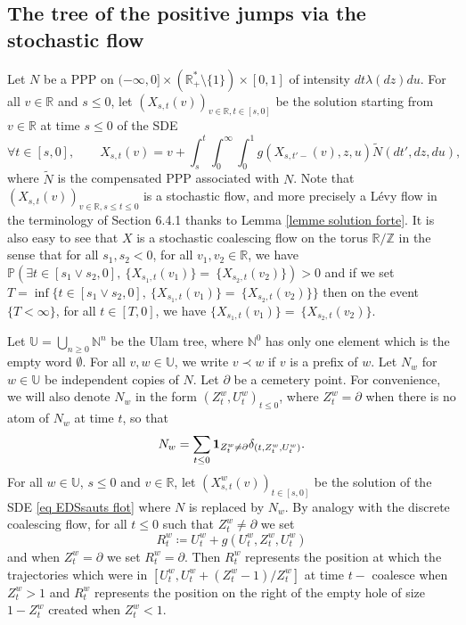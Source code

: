 \documentclass[11pt]{article}
\numberwithin{equation}{section}
\def \R{\mathbb {R}}
\def \N{\mathbb{N}}
\def \Z{\mathbb{Z}}
\def \U{\mathbb{U}}
\def\P{\mathbb{P}}
\begin{document}
\subsection{The tree of the positive jumps via the stochastic flow}\label{sous-section definition de la limite}
Let $N$ be a PPP on $(-\infty,0]\times (\R^*_+\setminus \{1\}) \times [0,1]$ of intensity $dt \lambda(dz)  du$. For all $v\in \R$ and $s\le 0$, let $(X_{s,t}(v))_{v \in \R,  t  \in [s,0]}$ be the solution starting from $v \in \R$ at time $s\le 0$ of the SDE
\begin{equation}\label{eq EDSsauts flot}
	\forall t \in [s,0],  \qquad
	X_{s,t}(v) = v+ \int_s^t \int_0^\infty \int_0^1 g(X_{s,t'-}(v),z,u) \widetilde{N}(d{t'},dz,du),
\end{equation}
where $\widetilde{N}$ is the compensated PPP associated with $N$. Note that $(X_{s,t}(v))_{v \in \R, s \le t \le 0}$ is a stochastic flow, and more precisely a Lévy flow in the terminology of \cite{App09} Section 6.4.1 thanks to Lemma \ref{lemme solution forte}. It is also easy to see that $X$ is a stochastic coalescing flow on the torus $\R/\Z$ in the sense that for all $s_1,s_2< 0$, for all $v_1,v_2 \in \R$, we have $\P(\exists t \in [s_1 \vee s_2, 0], \ \{X_{s_1,t}(v_1)\}=  \ \{X_{s_2,t}(v_2)\})>0$ and if we set $T= \inf \{ t\in [s_1 \vee s_2, 0], \ \{X_{s_1,t}(v_1)\}=  \ \{X_{s_2,t}(v_2)\} \}$ then on the event $\{T<\infty\}$, for all $t \in [T,0]$, we have $ \{X_{s_1,t}(v_1)\}=  \ \{X_{s_2,t}(v_2)\} $.


Let $\mathbb{U}= \bigcup_{n\ge 0} \N^n$ be the Ulam tree, where $\N^0$ has only one element which is the empty word $\emptyset$. For all $v,w\in \U$, we write $v\prec w$ if $v$ is a prefix of $w$. Let $N_w$ for $w \in \mathbb{U}$ be independent copies of $N$. Let $\partial$ be a cemetery point. For convenience, we will also denote $N_w$ in the form $(Z_t^w,U_t^w)_{t\le 0}$, where $Z_t^w = \partial$ when there is no atom of $N_w$ at time $t$, so that
$$
N_w =\sum_{t\le 0} {\bf 1}_{Z_t^w \neq \partial} \delta_{(t,Z^w_t, U^w_t)}.
$$ 
For all $w \in \mathbb{U}$, $s\le 0$ and $v\in \R$, let $\left(X^w_{s,t}(v) \right)_{t \in [s,0]}$ be the solution of the SDE \eqref{eq EDSsauts flot} where $N$ is replaced by $N_w$. By analogy with the discrete coalescing flow, for all $t \le 0$ such that $Z^w_t \neq \partial$ we set
$$
R^w_t \coloneqq U^w_t + g(U^w_t, Z^w_t, U^w_t)
$$
and when $Z^w_t = \partial$ we set $ R^w_t  = \partial$. Then $R^w_t$ represents the position at which the trajectories which were in $[U^w_t, U^w_t + (Z^w_t-1)/Z^w_t]$ at time $t-$ coalesce when $Z^w_t>1$ and $R^w_t$ represents the position on the right of the empty hole of size $1-Z^w_t$ created when $Z^w_t<1$.
\end{document}
